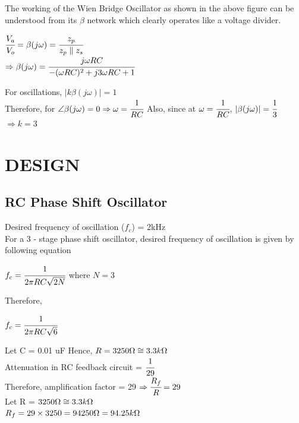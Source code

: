 \documentclass[12pt]{report}
\begin{document}
\begin{large}
The working of the Wien Bridge Oscillator as shown in the above figure can be understood from its $\beta$ network which clearly operates like a voltage divider.\\
\begin{center}
$\cfrac{V_a}{V_o} = \beta (j\omega) = \cfrac{z_p}{z_p\parallel z_s} $\\
$\Rightarrow\beta(j\omega) = \cfrac{j\omega RC}{-(\omega RC)^2 + j3\omega RC + 1}$
\end{center}

\begin{flushleft}
For oscillations, $|k\beta(j\omega)| = 1$\\
Therefore, for $\angle \beta (j\omega) = 0 \Rightarrow \omega = \cfrac{1}{RC}$ \tab Also, since at $\omega = \cfrac{1}{RC}$, $|\beta(j\omega)| = \cfrac{1}{3}$$\Rightarrow k = 3$
\end{flushleft}
\end{large}

\chapter{DESIGN}
\label{cap:name2}

\section{RC Phase Shift Oscillator}

\begin{large}
Desired frequency  of oscillation ($f_c$) = 2kHz\\
For a 3 - stage phase shift oscillator, desired frequency of oscillation is given by following equation\\
\begin{center}
    $f_c = \cfrac{1}{2\pi RC \sqrt{2N}}$ where $N = 3$
\end{center}
Therefore,
\begin{center}
    $f_c = \cfrac{1}{2\pi RC \sqrt{6}}$\\
\end{center}
Let C = 0.01 uF
Hence, $R = 3250\ohm \cong 3.3k\ohm$\\
Attenuation in RC feedback circuit  = $\cfrac{1}{29}$\\
Therefore, amplification factor = 29 $\Rightarrow \cfrac{R_f}{R} = 29$\\
Let R = $3250 \ohm \cong 3.3k\ohm$\\
\tab$R_f = 29\times3250 = 94250 \ohm = 94.25 k\ohm$ 
\end{large}
\end{document}
